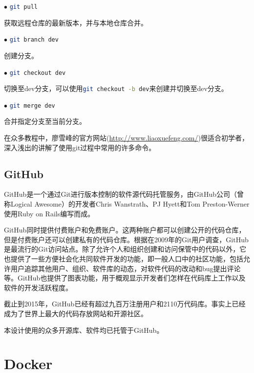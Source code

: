 			\par $\bullet$ \lstinline[language=sh]{git pull}
			\par 获取远程仓库的最新版本，并与本地仓库合并。
			\par $\bullet$ \lstinline[language=sh]{git branch dev}
			\par 创建分支。
			\par $\bullet$ \lstinline[language=sh]{git checkout dev}
			\par 切换至dev分支，可以使用\lstinline[language=sh]{git checkout -b dev}来创建并切换至dev分支。
			\par $\bullet$ \lstinline[language=sh]{git merge dev}
			\par 合并指定分支至当前分支。
			\par 在众多教程中，廖雪峰的官方网站(\href{http://www.liaoxuefeng.com/}{http://www.liaoxuefeng.com/})很适合初学者，深入浅出的讲解了使用git过程中常用的许多命令。
		\subsection{GitHub}
			\par GitHub是一个通过Git进行版本控制的软件源代码托管服务，由GitHub公司（曾称Logical Awesome）的开发者Chris Wanstrath、PJ Hyett和Tom Preston-Werner使用Ruby on Rails编写而成。
			\par GitHub同时提供付费账户和免费账户。这两种账户都可以创建公开的代码仓库，但是付费账户还可以创建私有的代码仓库。根据在2009年的Git用户调查，GitHub是最流行的Git访问站点。除了允许个人和组织创建和访问保管中的代码以外，它也提供了一些方便社会化共同软件开发的功能，即一般人口中的社区功能，包括允许用户追踪其他用户、组织、软件库的动态，对软件代码的改动和bug提出评论等。GitHub也提供了图表功能，用于概观显示开发者们怎样在代码库上工作以及软件的开发活跃程度。
			\par 截止到2015年，GitHub已经有超过九百万注册用户和2110万代码库。事实上已经成为了世界上最大的代码存放网站和开源社区。\cite{ wiki:GitHub}
			\par 本设计使用的众多开源库、软件均已托管于GitHub。
	\section{Docker}
